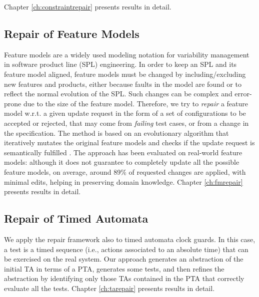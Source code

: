 Chapter \ref{ch:constraintrepair} presents results in detail.

\subsection{Repair of Feature Models}\label{sec:fmrepair}

Feature models are a widely used modeling notation for variability management in software product line (SPL) engineering. 
In order to keep an SPL and its feature model aligned, feature models must be changed by including/excluding new features and products, either because faults in the model are found or to reflect the normal evolution of the SPL.
Such changes can be complex and error-prone due to the size of the feature model.
Therefore, we try to \textit{repair} a feature model w.r.t. a given update request in the form of a set of configurations to be accepted or rejected, that may come from \textit{failing} test cases, or from a change in the specification.
The method is based on an evolutionary algorithm that iteratively mutates the original feature models and checks if the update request is semantically fulfilled \cite{arcaini_evolutionary_2018,arcaini2019achieving}. %
The approach has been evaluated on real-world feature models: although it does not guarantee to completely update all the possible feature models, on average, around 89\% of requested changes are applied, %
with minimal edits, helping in preserving domain knowledge.%
Chapter \ref{ch:fmrepair} presents results in detail.

\subsection{Repair of Timed Automata}
We apply the repair framework also to timed automata clock guards. In this case, a test is a timed sequence (i.e., actions associated to an absolute time) that can be exercised on the real system.
Our approach generates an abstraction of the initial TA in terms of a PTA, generates some tests, and then refines the abstraction by identifying only those TAs contained in the PTA that correctly evaluate all the tests. 
Chapter \ref{ch:tarepair} presents results in detail.


